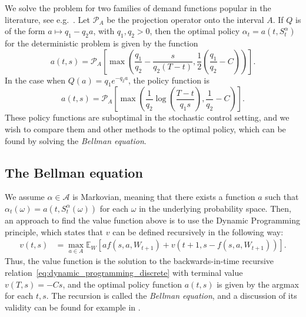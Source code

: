 \documentclass[main.tex]{subfiles}
\begin{document}
We solve the problem for two families of demand functions popular in
the literature, see e.g.~\citep[Ch.~7]{talluri2006theory}.
Let $\mathcal P_A$ be the projection operator onto the interval $A$.
If $Q$ is of the form $a\mapsto q_1-q_2a$, with $q_1,q_2> 0$, then
the optimal policy $\alpha_t=a(t,S_t^\alpha)$ for the deterministic
problem is given by the function
\begin{equation}
  a(t,s)=\mathcal P_A \left[ \max\left(
      \frac{q_1}{q_2}-\frac{s}{q_2(T-t)},\frac{1}{2}\left(\frac{q_1}{q_2}-C
      \right) \right) \right].
\end{equation}
In the case when $Q(a)=q_1e^{-q_2a}$, the policy function is
\begin{equation}
  a(t,s)=\mathcal P_A\left[
    \max\left( \frac{1}{q_2}\log\left( \frac{T-t}{q_1s}\right),
      \frac{1}{q_2}-C  \right)\right].
\end{equation}
These policy functions are suboptimal in the stochastic control
setting, and we wish to compare them and other methods to the optimal
policy, which can be found by solving the \emph{Bellman equation}.

\subsection{The Bellman equation}
We assume $\alpha\in\mathcal A$ is Markovian,
meaning that
there exists a function $a$ such that $\alpha_t(\omega) =
a(t,S_t^\alpha(\omega))$ for each $\omega$ in the underlying probability space.
Then,
an approach to find the value function above is to use the Dynamic
Programming principle, which states that $v$ can be defined
recursively in the following way:
\begin{align}\label{eq:dynamic_programming_discrete}
  v(t,s)&=\max_{a\in A}\mathbb E_{W}\left[
          af(s,a,W_{t+1})
          +v(t+1,s-f(s,a,W_{t+1}))\right].
\end{align}
Thus, the value function is the solution to the backwards-in-time
recursive relation~\eqref{eq:dynamic_programming_discrete} with
terminal value $v(T,s)=-Cs$, and the optimal policy
function $a(t,s)$ is given by the argmax for each $t,s$.
The recursion is called the \emph{Bellman equation}, and a discussion
of its validity can be found for example in \citet{bertsekas2005dynamic}.
\end{document}
